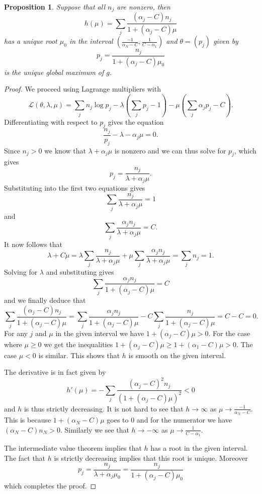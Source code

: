 \documentclass{article}
\theoremstyle{plain}
\newtheorem{proposition} {\bf Proposition} [section]
\theoremstyle{definition}
\begin{document}
\begin{proposition}\label{uniqueroot}
	Suppose that all $n_j$ are nonzero, then $$h(\mu)=\sum_j \frac{(\alpha_j-C)n_j}
	{1+(\alpha_j-C)\mu}$$
	has a unique root $\mu_0$ in the interval $\left(\frac{-1}{\alpha_N-C},\frac{1}
	{C-\alpha_1}\right)$
	and $\theta=(p_j)$ given by $$p_j=\frac{n_j}{1+(\alpha_j-C)\mu_0}$$
	is the unique global maximum of $g$.
\end{proposition}
\begin{proof}
	We proceed using Lagrange multipliers with $$\mathcal{L(\theta,\lambda,\mu)}=\sum_j
	n_j \log p_j-\lambda\left(\sum_j p_j-1\right)-\mu\left(\sum_j \alpha_jp_j-C\right).$$
	Differentiating with respect to $p_j$ gives the equation $$\frac{n_j}{p_j}-\lambda-
	\alpha_j\mu=0.$$ Since $n_j>0$ we know that $\lambda+\alpha_j\mu$ is nonzero and
	we can thus solve for $p_j$, which gives
	$$p_j=\frac{n_j}{\lambda+\alpha_j\mu}.$$ Substituting into the first two equations
	gives $$\sum_j\frac{n_j}{\lambda+\alpha_j\mu}=1$$ and
	$$\sum_j\frac{\alpha_jn_j}{\lambda+\alpha_j\mu}=C.$$ It now follows that $$\lambda+C\mu=
	\lambda\sum_j\frac{n_j}{\lambda+\alpha_j\mu}+\mu\sum_j\frac{\alpha_jn_j}{\lambda+
	\alpha_j\mu}=\sum_j n_j=1.$$ Solving for $\lambda$ and substituting gives
	$$\sum_j\frac{\alpha_jn_j}{1+(\alpha_j-C)\mu}=C$$ and we finally deduce that
	$$\sum_j\frac{(\alpha_j-C)n_j}{1+(\alpha_j-C)\mu}=\sum_j\frac{\alpha_jn_j}{1+(\alpha_j
	-C)\mu}-C\sum_j\frac{n_j}{1+(\alpha_j-C)\mu}=C-C=0.$$
	For any $j$ and $\mu$ in the given interval we have $1+(\alpha_j-C)\mu>0$. For the
	case where $\mu\geq0$ we get the inequalities $1+(\alpha_j-C)\mu\geq1+(\alpha_1-C)\mu>0$.
	The case $\mu<0$ is similar. This shows that $h$ is smooth on the given interval.

	The derivative is in fact given by $$h'(\mu)=-\sum_j \frac{(\alpha_j-C)^2n_j}{(1+
	(\alpha_j-C)\mu)^2}<0$$ and $h$ is thus strictly decreasing. It is not hard to
	see that $h\to\infty$ as $\mu\to\frac{-1}{\alpha_N-C}$. This is because
	$1+(\alpha_N-C)\mu$ goes to $0$ and for the numerator we have $(\alpha_N-C)n_N>0$.
	Similarly we see that $h\to-\infty$ as $\mu\to\frac1{C-\alpha_1}$.

	The intermediate value theorem implies that $h$ has a root in the given interval.
	The fact that $h$ is strictly decreasing implies that this root is unique.
	Moreover $$p_j=\frac{n_j}{\lambda+\alpha_j\mu_0}=\frac{n_j}{1+(\alpha_j-
	C)\mu_0}$$ which completes the proof.
\end{proof}
\end{document}
